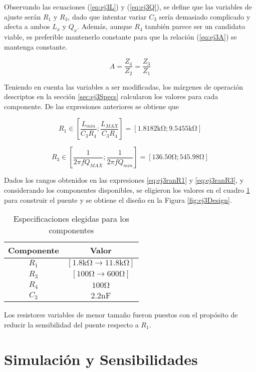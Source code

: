     Observando las ecuaciones (\ref{eq:ej3L}) y (\ref{eq:ej3Q}), se define que las variables
    de ajuste serán $R_1$ y $R_3$, dado que intentar variar $C_3$ sería demasiado 
    complicado y afecta a ambos $L_x$ y $Q_x$. Además, aunque $R_4$ también parece
    ser un candidato viable, es preferible mantenerlo constante para que la relación
    (\ref{eq:ej3A}) se mantenga constante.
    
    \begin{equation}
        A=\frac{Z_4}{Z_2}=\frac{Z_3}{Z_1}
        \label{eq:ej3A}
    \end{equation}
    
    Teniendo en cuenta las variables a ser modificadas, los márgenes de operación
    descriptos en la sección \ref{sec:ej3Specs} calcularon los valores para cada componente.
    De las expresiones anteriores se obtiene que

    \begin{equation}
        R_1 \in [\frac{L_{min}}{C_3 R_4};\frac{L_{MAX}}{C_3 R_4}] = [1.8182\si{\kilo\ohm}; 9.5455\si{\kilo\ohm}]
        \label{eq:ej3ranR1}
    \end{equation}

    \begin{equation}
        R_3 \in [\frac{1}{2 \pi f Q_{MAX}}; \frac{1}{2 \pi f Q_{min}}] = [136.50\si{\ohm}; 545.98\si{\ohm}]
        \label{eq:ej3ranR3}
    \end{equation}

    Dados los rangos obtenidos en las expresiones \ref{eq:ej3ranR1} y \ref{eq:ej3ranR3}, y considerando
    los componentes disponibles, se eligieron los valores en el cuadro \ref{tab:ej3Specs} para construir
    el puente y se obtiene el diseño en la Figura \ref{fig:ej3Design}.

    \begin{table}[h]
        \begin{center}
            \begin{tabular}{|c|c|}
                \hline
                Componente & Valor \\
                \hline
                $R_1$ & $[1.8\si{\kilo\ohm} \rightarrow 11.8\si{\kilo\ohm}]$\\
                $R_3$ & $[100\si{\ohm} \rightarrow 600\si{\ohm}]$\\
                $R_4$ & $100\si{\ohm}$\\
                $C_3$ & $2.2\si{\nano\farad}$\\
                \hline
            \end{tabular}
            \caption{Especificaciones elegidas para los componentes}
            \label{tab:ej3Specs}
        \end{center}
    \end{table}
    \begin{figure}[ht!]
        \begin{center}
            
        \end{center}
    \end{figure}

    Los resistores variables de menor tamaño fueron puestos con el propósito de reducir
    la sensibilidad del puente respecto a $R_1$.

    \newpage
    \section{Simulación y Sensibilidades}